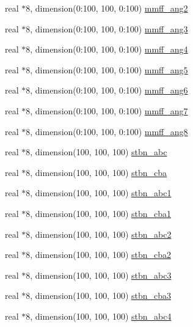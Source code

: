 \begin{DoxyCompactItemize}
\item 
real $\ast$8, dimension(0\-:100, 100, 0\-:100) \hyperlink{classmerck_a3fa27d9ab1c59c628afb8e59f653ac43}{mmff\-\_\-ang2}
\item 
real $\ast$8, dimension(0\-:100, 100, 0\-:100) \hyperlink{classmerck_a5fd32c39132b64c5d1a171dd6496bca6}{mmff\-\_\-ang3}
\item 
real $\ast$8, dimension(0\-:100, 100, 0\-:100) \hyperlink{classmerck_ae7864fd083808a80c93f10ff6b2ca903}{mmff\-\_\-ang4}
\item 
real $\ast$8, dimension(0\-:100, 100, 0\-:100) \hyperlink{classmerck_a4ec8957742f39e580dede849a1cded9d}{mmff\-\_\-ang5}
\item 
real $\ast$8, dimension(0\-:100, 100, 0\-:100) \hyperlink{classmerck_abe0cc32fc24620297c23877495b7c851}{mmff\-\_\-ang6}
\item 
real $\ast$8, dimension(0\-:100, 100, 0\-:100) \hyperlink{classmerck_adbca68738b40baa8b5c799253076db2f}{mmff\-\_\-ang7}
\item 
real $\ast$8, dimension(0\-:100, 100, 0\-:100) \hyperlink{classmerck_a8669ff02d8bb48b952f4022ebfb40465}{mmff\-\_\-ang8}
\item 
real $\ast$8, dimension(100, 100, 100) \hyperlink{classmerck_a026dca81a6c307c641bba56cfd4302f3}{stbn\-\_\-abc}
\item 
real $\ast$8, dimension(100, 100, 100) \hyperlink{classmerck_a424fc725470a2afe10ec6a2ba8392ea7}{stbn\-\_\-cba}
\item 
real $\ast$8, dimension(100, 100, 100) \hyperlink{classmerck_a34a229bbafcaa423bb5733b21c50517c}{stbn\-\_\-abc1}
\item 
real $\ast$8, dimension(100, 100, 100) \hyperlink{classmerck_a0f41d68964ee35708b21207d39b37b74}{stbn\-\_\-cba1}
\item 
real $\ast$8, dimension(100, 100, 100) \hyperlink{classmerck_a78e5ceb735bb8919ea1340cde70d39fb}{stbn\-\_\-abc2}
\item 
real $\ast$8, dimension(100, 100, 100) \hyperlink{classmerck_a8ce0bd0a66cc17246fd5b41f993a3ffb}{stbn\-\_\-cba2}
\item 
real $\ast$8, dimension(100, 100, 100) \hyperlink{classmerck_aba98d0393b91fcf3e9afe92f053bd534}{stbn\-\_\-abc3}
\item 
real $\ast$8, dimension(100, 100, 100) \hyperlink{classmerck_a622e2393fd9bd1a8832e51ecdc90ed01}{stbn\-\_\-cba3}
\item 
real $\ast$8, dimension(100, 100, 100) \hyperlink{classmerck_ad3d061d53e6814d08576d8984c9bcfc3}{stbn\-\_\-abc4}
\item 

\end{DoxyCompactItemize}
